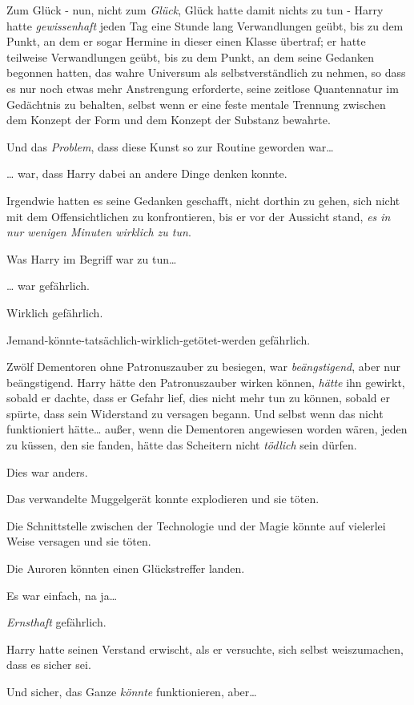 {Zum Glück - nun, nicht zum \emph{Glück}, Glück hatte damit nichts zu tun - Harry hatte \emph{gewissenhaft} jeden Tag eine Stunde lang Verwandlungen geübt, bis zu dem Punkt, an dem er sogar Hermine in dieser einen Klasse übertraf; er hatte teilweise Verwandlungen geübt, bis zu dem Punkt, an dem seine Gedanken begonnen hatten, das wahre Universum als selbstverständlich zu nehmen, so dass es nur noch etwas mehr Anstrengung erforderte, seine zeitlose Quantennatur im Gedächtnis zu behalten, selbst wenn er eine feste mentale Trennung zwischen dem Konzept der Form und dem Konzept der Substanz bewahrte.

Und das \emph{Problem}, dass diese Kunst so zur Routine geworden war…

… war, dass Harry dabei an andere Dinge denken konnte.

Irgendwie hatten es seine Gedanken geschafft, nicht dorthin zu gehen, sich nicht mit dem Offensichtlichen zu konfrontieren, bis er vor der Aussicht stand, \emph{es in nur wenigen Minuten wirklich zu tun}.

Was Harry im Begriff war zu tun…

… war gefährlich.

Wirklich gefährlich.

Jemand-könnte-tatsächlich-wirklich-getötet-werden gefährlich.

Zwölf Dementoren ohne Patronuszauber zu besiegen, war \emph{beängstigend}, aber nur beängstigend. Harry hätte den Patronuszauber wirken können, \emph{hätte} ihn gewirkt, sobald er dachte, dass er Gefahr lief, dies nicht mehr tun zu können, sobald er spürte, dass sein Widerstand zu versagen begann. Und selbst wenn das nicht funktioniert hätte… außer, wenn die Dementoren angewiesen worden wären, jeden zu küssen, den sie fanden, hätte das Scheitern nicht \emph{tödlich} sein dürfen.

Dies war anders.

Das verwandelte Muggelgerät konnte explodieren und sie töten.

Die Schnittstelle zwischen der Technologie und der Magie könnte auf vielerlei Weise versagen und sie töten.

Die Auroren könnten einen Glückstreffer landen.

Es war einfach, na ja…

\emph{Ernsthaft} gefährlich.

Harry hatte seinen Verstand erwischt, als er versuchte, sich selbst weiszumachen, dass es sicher sei.

Und sicher, das Ganze \emph{könnte} funktionieren, aber…

}
